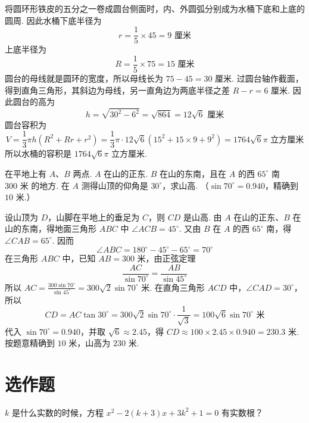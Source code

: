 \documentclass[UTF8,a4paper,oneside,11pt]{ctexbook}
\begin{document}
\begin{solution}
将圆环形铁皮的五分之一卷成圆台侧面时，内、外圆弧分别成为水桶下底和上底的圆周. 因此水桶下底半径为
\[
r=\frac{1}{5}\times45=9\text{ 厘米}
\]
上底半径为
\[
R=\frac{1}{5}\times75=15\text{ 厘米}
\]
圆台的母线就是圆环的宽度，所以母线长为 \(75-45=30\text{ 厘米}\). 过圆台轴作截面，得到直角三角形，其斜边为母线，另一直角边为两底半径之差 \(R-r=6\text{ 厘米}\). 因此圆台的高为
\[
h=\sqrt{30^2-6^2}=\sqrt{864}=12\sqrt6\text{ 厘米}
\]
圆台容积为
\[
V=\frac{1}{3}\pi h\left(R^2+Rr+r^2\right)=\frac{1}{3}\pi\cdot12\sqrt6\left(15^2+15\times9+9^2\right)=1764\sqrt6\pi\text{ 立方厘米}
\]
所以水桶的容积是 \(1764\sqrt6\pi\text{ 立方厘米}\).
\end{solution}

\begin{problem}
在平地上有 \(A\)、\(B\) 两点. \(A\) 在山的正东. \(B\) 在山的东南，且在 \(A\) 的西 \(65^\circ\) 南 \(300\text{ 米}\) 的地方. 在 \(A\) 测得山顶的仰角是 \(30^\circ\)，求山高. （\(\sin70^\circ=0.940\)，精确到 \(10\text{ 米}\).）
\end{problem}

\begin{solution}
设山顶为 \(D\)，山脚在平地上的垂足为 \(C\)，则 \(CD\) 是山高. 由 \(A\) 在山的正东、\(B\) 在山的东南，得地面三角形 \(ABC\) 中 \(\angle ACB=45^\circ\). 又由 \(B\) 在 \(A\) 的西 \(65^\circ\) 南，得 \(\angle CAB=65^\circ\). 因而
\[
\angle ABC=180^\circ-45^\circ-65^\circ=70^\circ
\]
在三角形 \(ABC\) 中，已知 \(AB=300\text{ 米}\)，由正弦定理
\[
\frac{AC}{\sin70^\circ}=\frac{AB}{\sin45^\circ}
\]
所以 \(AC=\frac{300\sin70^\circ}{\sin45^\circ}=300\sqrt2\sin70^\circ\text{ 米}\).
在直角三角形 \(ACD\) 中，\(\angle CAD=30^\circ\)，所以
\[
CD=AC\tan30^\circ=300\sqrt2\sin70^\circ\cdot\frac{1}{\sqrt3}=100\sqrt6\sin70^\circ\text{ 米}
\]
代入 \(\sin70^\circ=0.940\)，并取 \(\sqrt6\approx2.45\)，得 \(CD\approx100\times2.45\times0.940=230.3\text{ 米}\). 按题意精确到 \(10\text{ 米}\)，山高为 \(230\text{ 米}\).

\end{solution}

\section{选作题}

\begin{problem}
\(k\) 是什么实数的时候，方程 \(x^2-2\left(k+3\right)x+3k^2+1=0\) 有实数根？
\end{problem}
\end{document}
